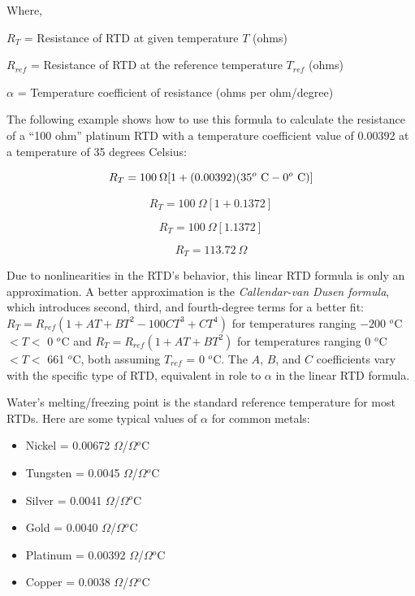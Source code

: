 \noindent
Where,

$R_T$ = Resistance of RTD at given temperature $T$ (ohms)

$R_{ref}$ = Resistance of RTD at the reference temperature $T_{ref}$ (ohms)

$\alpha$ = Temperature coefficient of resistance (ohms per ohm/degree)

\vskip 10pt

The following example shows how to use this formula to calculate the resistance of a ``100 ohm'' platinum RTD with a temperature coefficient value of 0.00392 at a temperature of 35 degrees Celsius:

$$R_T = 100 \> \Omega [1 + (0.00392)(35^o \hbox{ C} - 0^o \hbox{ C})]$$

$$R_T = 100 \> \Omega [1 + 0.1372]$$

$$R_T = 100 \> \Omega [1.1372]$$

$$R_T = 113.72 \> \Omega$$

\vskip 10pt

Due to nonlinearities in the RTD's behavior, this linear RTD formula is only an approximation.  A better approximation is the \textit{Callendar-van Dusen formula}, which introduces second, third, and fourth-degree terms for a better fit: $R_T = R_{ref}(1 + AT + BT^2 -100 CT^3 + CT^4)$ for temperatures ranging $-200$ $^{o}$C $< T <$ 0 $^{o}$C and $R_T = R_{ref}(1 + AT + BT^2)$ for temperatures ranging 0 $^{o}$C $< T <$ 661 $^{o}$C, both assuming $T_{ref}$ = 0 $^{o}$C.  The $A$, $B$, and $C$ coefficients vary with the specific type of RTD, equivalent in role to $\alpha$ in the linear RTD formula.  


\vskip 10pt

Water's melting/freezing point is the standard reference temperature for most RTDs.  Here are some typical values of $\alpha$ for common metals:

\begin{itemize}
\item Nickel = 0.00672 $\Omega$/$\Omega$$^{o}$C
\item Tungsten = 0.0045 $\Omega$/$\Omega$$^{o}$C
\item Silver = 0.0041 $\Omega$/$\Omega$$^{o}$C
\item Gold = 0.0040 $\Omega$/$\Omega$$^{o}$C
\item Platinum = 0.00392 $\Omega$/$\Omega$$^{o}$C
\item Copper = 0.0038 $\Omega$/$\Omega$$^{o}$C
\end{itemize}


